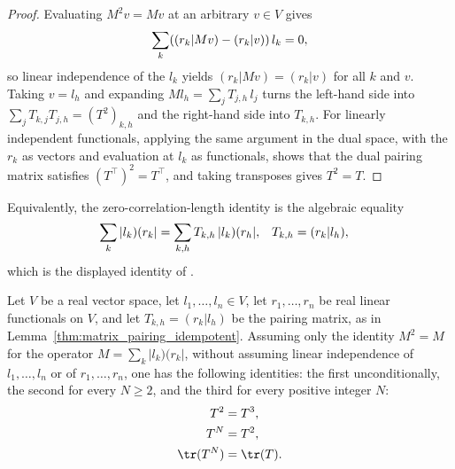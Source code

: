 \begin{proof}
    \leanok
    Evaluating $M^2v=Mv$ at an arbitrary $v\in V$ gives
    \begin{align}
        \sum_k((r_k|Mv)-(r_k|v))\,l_k=0,
        \notag
    \end{align}
    so linear independence of the $l_k$ yields $(r_k|Mv)=(r_k|v)$ for all $k$
    and $v$. Taking $v=l_h$ and expanding
    $Ml_h=\sum_jT_{j,h}\,l_j$ turns the left-hand side into
    $\sum_jT_{k,j}T_{j,h}=(T^2)_{k,h}$ and the right-hand side into
    $T_{k,h}$. For linearly independent functionals, applying the same argument
    in the dual space, with the $r_k$ as vectors and evaluation at $l_k$ as
    functionals, shows that the dual pairing matrix satisfies
    $(T^\top)^2=T^\top$, and taking transposes gives $T^2=T$.
\end{proof}

Equivalently, the zero-correlation-length identity is the algebraic equality
\begin{align}
    \sum_k|l_k)(r_k|
            & =\sum_{k,h}T_{k,h}\,|l_k)(r_h|,
            &
    T_{k,h} & =(r_k|l_h),
    \notag
\end{align}
which is the displayed identity of
\cite[Appendix~C.2, lines~1490--1493]{Cirac2016MPDO_arXiv}.

\begin{lemma}
    \label{thm:matrix_pairing_sq_eq_cube}
    \leanok
    Let $V$ be a real vector space, let $l_1,\ldots,l_n\in V$, let
    $r_1,\ldots,r_n$ be real linear functionals on $V$, and let
    $T_{k,h}=(r_k|l_h)$ be the pairing matrix, as in
    Lemma~\ref{thm:matrix_pairing_idempotent}. Assuming only the identity
    $M^2=M$ for the operator $M=\sum_k|l_k)(r_k|$, without assuming linear
    independence of $l_1,\ldots,l_n$ or of $r_1,\ldots,r_n$, one has the
    following identities: the first unconditionally, the second for every
    $N\geq2$, and the third for every positive integer $N$:
    \begin{align}
        T^2      & =T^3,
        \notag              \\
        T^N      & =T^2,
        \notag              \\
        \tr(T^N) & =\tr(T).
        \notag
    \end{align}
\end{lemma}

